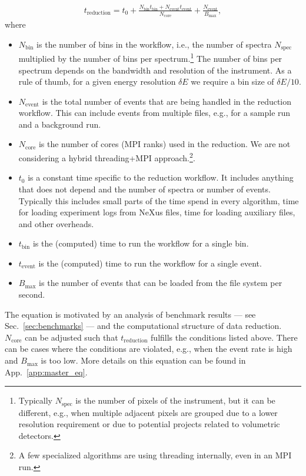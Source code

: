 \documentclass[a4paper,english,numbers=noenddot,bibliography=totoc,chapterprefix=on,DIV=12]{scrartcl}
\newcommand{\Treduction}{t_{\text{reduction}}}
\newcommand{\Tbin}{t_{\text{bin}}}
\newcommand{\Tevent}{t_{\text{event}}}
\newcommand{\Nbin}{N_{\text{bin}}}
\newcommand{\Ncore}{N_{\text{core}}}
\newcommand{\Nevent}{N_{\text{event}}}
\newcommand{\Nspec}{N_{\text{spec}}}
\newcommand{\Bmax}{B_{\text{max}}}
\begin{document}
\begin{align}
  \Treduction = t_0 + \frac{\Nbin\Tbin + \Nevent\Tevent}{\Ncore} + \frac{\Nevent}{\Bmax},
  \label{eq:master}
\end{align}
where
\begin{itemize}
  \item $\Nbin$ is the number of bins in the workflow, i.e., the number of spectra $\Nspec$ multiplied by the number of bins per spectrum.\footnote{Typically $\Nspec$ is the number of pixels of the instrument, but it can be different, e.g., when multiple adjacent pixels are grouped due to a lower resolution requirement or due to potential projects related to volumetric detectors.}
    The number of bins per spectrum depends on the bandwidth and resolution of the instrument.
    As a rule of thumb, for a given energy resolution $\delta E$ we require a bin size of $\delta E/10$.
  \item $\Nevent$ is the total number of events that are being handled in the reduction workflow.
    This can include events from multiple files, e.g., for a sample run and a background run.
  \item $\Ncore$ is the number of cores (MPI ranks) used in the reduction.
    We are not considering a hybrid threading+MPI approach.\footnote{A few specialized algorithms are using threading internally, even in an MPI run.}.
  \item $t_0$ is a constant time specific to the reduction workflow.
    It includes anything that does not depend and the number of spectra or number of events.
    Typically this includes small parts of the time spend in every algorithm, time for loading experiment logs from NeXus files, time for loading auxiliary files, and other overheads.
  \item $\Tbin$ is the (computed) time to run the workflow for a single bin.
  \item $\Tevent$ is the (computed) time to run the workflow for a single event.
  \item $\Bmax$ is the number of events that can be loaded from the file system per second.
\end{itemize}
The equation is motivated by an analysis of benchmark results --- see Sec.~\ref{sec:benchmarks} --- and the computational structure of data reduction.
$\Ncore$ can be adjusted such that $\Treduction$ fulfills the conditions listed above.
There can be cases where the conditions are violated, e.g., when the event rate is high and $\Bmax$ is too low.
More details on this equation can be found in App.~\ref{app:master_eq}.
\end{document}
